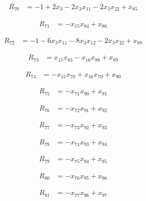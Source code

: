 \begin{align*}
R_{70} &= -1 +2 x_{3} -2 x_{3} x_{11} -2 x_{3} x_{22} +x_{85}
\end{align*}

\begin{align*}
R_{71} &= -x_{15} x_{84} +x_{86}
\end{align*}

\begin{align*}
R_{72} &= -1 -6 x_{3} x_{11} -8 x_{3} x_{12} -2 x_{3} x_{22} +x_{88}
\end{align*}

\begin{align*}
R_{73} &= x_{15} x_{83} -x_{16} x_{88} +x_{89}
\end{align*}

\begin{align*}
R_{74} &= -x_{15} x_{70} +x_{16} x_{70} +x_{90}
\end{align*}

\begin{align*}
R_{75} &= -x_{71} x_{90} +x_{91}
\end{align*}

\begin{align*}
R_{76} &= -x_{72} x_{91} +x_{92}
\end{align*}

\begin{align*}
R_{77} &= -x_{73} x_{92} +x_{93}
\end{align*}

\begin{align*}
R_{78} &= -x_{74} x_{93} +x_{94}
\end{align*}

\begin{align*}
R_{79} &= -x_{75} x_{94} +x_{95}
\end{align*}

\begin{align*}
R_{80} &= -x_{76} x_{95} +x_{96}
\end{align*}

\begin{align*}
R_{81} &= -x_{77} x_{96} +x_{97}
\end{align*}

